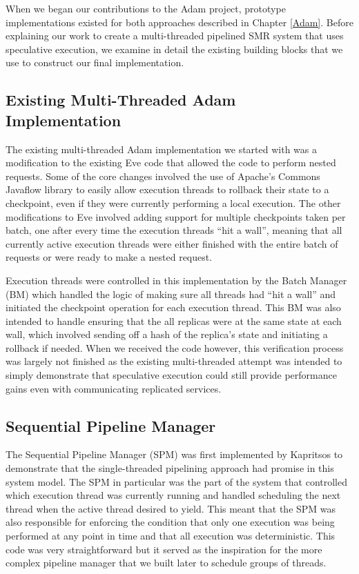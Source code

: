 \documentclass[11pt, oneside]{report}
\begin{document}
When we began our contributions to the Adam project, prototype implementations existed for both approaches described in Chapter \ref{Adam}. 
Before explaining our work to create a multi-threaded pipelined SMR system that uses speculative execution, we examine in detail the existing building blocks that we use to construct our final implementation.

\subsection{Existing Multi-Threaded Adam Implementation}\label{BM}

The existing multi-threaded Adam implementation we started with was a modification to the existing Eve \cite{eve} code that allowed the code to perform nested requests. 
Some of the core changes involved the use of Apache's Commons Javaflow library \cite{javaflow} to easily allow execution threads to rollback their state to a checkpoint, even if they were currently performing a local execution. 
The other modifications to Eve involved adding support for multiple checkpoints taken per batch, one after every time the execution threads ``hit a wall'', meaning that all currently active execution threads were either finished with the entire batch of requests or were ready to make a nested request.

Execution threads were controlled in this implementation by the Batch Manager (BM) which handled the logic of making sure all threads had ``hit a wall'' and initiated the checkpoint operation for each execution thread. 
This BM was also intended to handle ensuring that the all replicas were at the same state at each wall, which involved sending off a hash of the replica's state and initiating a rollback if needed. 
When we received the code however, this verification process was largely not finished as the existing multi-threaded attempt was intended to simply demonstrate that speculative execution could still provide performance gains even with communicating replicated services.

\subsection{Sequential Pipeline Manager}\label{SPM}

The Sequential Pipeline Manager (SPM) was first implemented by Kapritsos to demonstrate that the single-threaded pipelining approach had promise in this system model. 
The SPM in particular was the part of the system that controlled which execution thread was currently running and handled scheduling the next thread when the active thread desired to yield.
This meant that the SPM was also responsible for enforcing the condition that only one execution was being performed at any point in time and that all execution was deterministic.
This code was very straightforward but it served as the inspiration for the more complex pipeline manager that we built later to schedule groups of threads.
\end{document}

